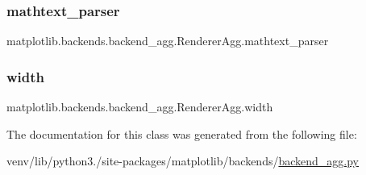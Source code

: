 \subsubsection{\texorpdfstring{mathtext\+\_\+parser}{mathtext\_parser}}
{\footnotesize\ttfamily matplotlib.\+backends.\+backend\+\_\+agg.\+Renderer\+Agg.\+mathtext\+\_\+parser}

\mbox{\label{classmatplotlib_1_1backends_1_1backend__agg_1_1RendererAgg_a560412f63564c0fc881c5a7d7d9a3d9c}} 
\subsubsection{\texorpdfstring{width}{width}}
{\footnotesize\ttfamily matplotlib.\+backends.\+backend\+\_\+agg.\+Renderer\+Agg.\+width}



The documentation for this class was generated from the following file\+:\begin{DoxyCompactItemize}
\item 
venv/lib/python3./site-\/packages/matplotlib/backends/\hyperlink{backend__agg_8py}{backend\+\_\+agg.\+py}\end{DoxyCompactItemize}

